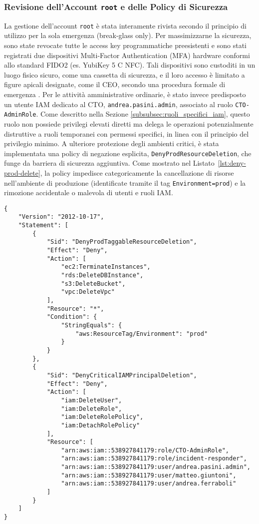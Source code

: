 \subsubsection{Revisione dell'Account \texttt{root} e delle Policy di Sicurezza}
La gestione dell'account \texttt{root} è stata interamente rivista secondo il principio di utilizzo per la sola emergenza (break-glass only). Per massimizzarne la sicurezza, sono state revocate tutte le access key programmatiche preesistenti e sono stati registrati due dispositivi Multi-Factor Authentication (MFA) hardware conformi allo standard FIDO2 (es. YubiKey 5 C NFC). Tali dispositivi sono custoditi in un luogo fisico sicuro, come una cassetta di sicurezza, e il loro accesso è limitato a figure apicali designate, come il CEO, secondo una procedura formale di emergenza \cite{saraswat:breakglass, clouddefense:mfa}.
Per le attività amministrative ordinarie, è stato invece predisposto un utente IAM dedicato al CTO, \texttt{andrea.pasini.admin}, associato al ruolo \texttt{CTO-AdminRole}. Come descritto nella Sezione \ref{subsubsec:ruoli_specifici_iam}, questo ruolo non possiede privilegi elevati diretti ma delega le operazioni potenzialmente distruttive a ruoli temporanei con permessi specifici, in linea con il principio del privilegio minimo.
A ulteriore protezione degli ambienti critici, è stata implementata una policy di negazione esplicita, \texttt{DenyProdResourceDeletion}, che funge da barriera di sicurezza aggiuntiva. Come mostrato nel Listato~\ref{lst:deny-prod-delete}, la policy impedisce categoricamente la cancellazione di risorse nell'ambiente di produzione (identificate tramite il tag \texttt{Environment=prod}) e la rimozione accidentale o malevola di utenti e ruoli IAM.
\begin{lstlisting}[style=json, caption={Policy IAM per negare eliminazioni in produzione}, label=lst:deny-prod-delete]
  {
    "Version": "2012-10-17",
    "Statement": [
        {
            "Sid": "DenyProdTaggableResourceDeletion",
            "Effect": "Deny",
            "Action": [
                "ec2:TerminateInstances",
                "rds:DeleteDBInstance",
                "s3:DeleteBucket",
                "vpc:DeleteVpc"
            ],
            "Resource": "*",
            "Condition": {
                "StringEquals": {
                    "aws:ResourceTag/Environment": "prod"
                }
            }
        },
        {
            "Sid": "DenyCriticalIAMPrincipalDeletion",
            "Effect": "Deny",
            "Action": [
                "iam:DeleteUser",
                "iam:DeleteRole",
                "iam:DeleteRolePolicy",
                "iam:DetachRolePolicy"
            ],
            "Resource": [
                "arn:aws:iam::538927841179:role/CTO-AdminRole",
                "arn:aws:iam::538927841179:role/incident-responder",
                "arn:aws:iam::538927841179:user/andrea.pasini.admin",
                "arn:aws:iam::538927841179:user/matteo.giuntoni",
                "arn:aws:iam::538927841179:user/andrea.ferraboli"
            ]
        }
    ]
}
\end{lstlisting}

